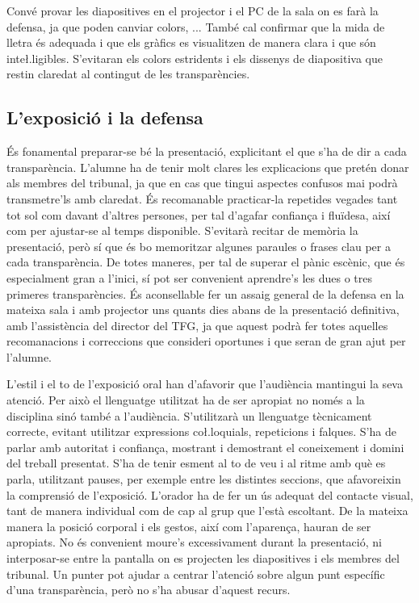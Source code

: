         Convé provar les diapositives en el projector i el PC de la sala on es farà la defensa, ja que poden canviar colors, ... També cal confirmar que la mida de lletra és adequada i que els gràfics es visualitzen de manera clara i que són inte\l.ligibles. S'evitaran els colors estridents i els dissenys de diapositiva que restin claredat al contingut de les transparències.

\subsection{L'exposició i la defensa}

        És fonamental preparar-se bé la presentació, explicitant el que s'ha de dir a cada transparència. L'alumne ha de tenir molt clares les explicacions que pretén donar als membres del tribunal, ja que en cas que tingui aspectes confusos mai podrà transmetre'ls amb claredat. És recomanable practicar-la repetides vegades tant tot sol com davant d'altres persones, per tal d'agafar confiança i fluïdesa, així com per ajustar-se al temps disponible. S'evitarà recitar de memòria la presentació, però sí que és bo memoritzar algunes paraules o frases clau per a cada transparència. De totes maneres, per tal de superar el pànic escènic, que és especialment gran a l'inici, sí pot ser convenient aprendre's les dues o tres primeres transparències. És aconsellable fer un assaig general de la defensa en la mateixa sala i amb projector uns quants dies abans de la presentació definitiva, amb l'assistència del director del \ac{TFG}, ja que aquest podrà fer totes aquelles recomanacions i correccions que consideri oportunes i que seran de gran ajut per l'alumne.

        L'estil i el to de l'exposició oral han d'afavorir que l'audiència mantingui la seva atenció. Per això el llenguatge utilitzat ha de ser apropiat no només a la disciplina sinó també a l'audiència. S'utilitzarà un llenguatge tècnicament correcte, evitant utilitzar expressions co\l.loquials, repeticions i falques. S'ha de parlar amb autoritat i confiança, mostrant i demostrant el coneixement i domini del treball presentat. S'ha de tenir esment al to de veu i al ritme amb què es parla, utilitzant pauses, per exemple entre les distintes seccions, que afavoreixin la comprensió de l'exposició. L'orador ha de fer un ús adequat del contacte visual, tant de manera individual com de cap al grup que l'està escoltant. De la mateixa manera la posició corporal i els gestos, així com l'aparença, hauran de ser apropiats. No és convenient moure's excessivament durant la presentació, ni interposar-se entre la pantalla on es projecten les diapositives i els membres del tribunal. Un punter pot ajudar a centrar l'atenció sobre algun punt específic d'una transparència, però no s'ha abusar d'aquest recurs.

